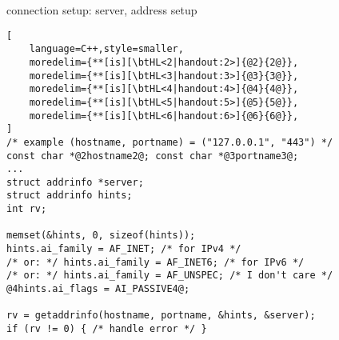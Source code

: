 \begin{frame}[fragile,label=connSetupServerLookup]{connection setup: server, address setup}
\begin{lstlisting}[
    language=C++,style=smaller,
    moredelim={**[is][\btHL<2|handout:2>]{@2}{2@}},
    moredelim={**[is][\btHL<3|handout:3>]{@3}{3@}},
    moredelim={**[is][\btHL<4|handout:4>]{@4}{4@}},
    moredelim={**[is][\btHL<5|handout:5>]{@5}{5@}},
    moredelim={**[is][\btHL<6|handout:6>]{@6}{6@}},
]
/* example (hostname, portname) = ("127.0.0.1", "443") */
const char *@2hostname2@; const char *@3portname3@;
...
struct addrinfo *server;
struct addrinfo hints;
int rv;

memset(&hints, 0, sizeof(hints));
hints.ai_family = AF_INET; /* for IPv4 */
/* or: */ hints.ai_family = AF_INET6; /* for IPv6 */
/* or: */ hints.ai_family = AF_UNSPEC; /* I don't care */
@4hints.ai_flags = AI_PASSIVE4@;

rv = getaddrinfo(hostname, portname, &hints, &server);
if (rv != 0) { /* handle error */ }
\end{lstlisting}
\end{frame}


